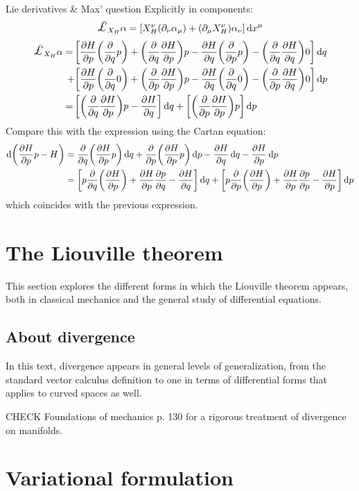 \begin{aside}{Lie derivatives \& Max' question}
    Explicitly in components:
    \begin{equation*}
        \lied{X_H}{\alpha} = \qty[X_H^{\nu}(\partial_{\nu}\alpha_{\mu}) + (\partial_{\mu} X_H^{\nu})\alpha_{\nu}]\dd{x}^{\mu}
    \end{equation*}
    \begin{equation*}
        \begin{split}
            \lied{X_H}{\alpha} =\, &\qty[\pdv{H}{p}\qty(\pdv{}{q}p) + \qty(\pdv{}{q}\pdv{H}{p})p - \pdv{H}{q}\qty(\pdv{}{p}p) - \qty(\pdv{}{q}\pdv{H}{q})0]\dd{q} \\
                                + &\qty[\pdv{H}{p}\qty(\pdv{}{q}0) + \qty(\pdv{}{p}\pdv{H}{p})p - \pdv{H}{q}\qty(\pdv{}{q} 0) - \qty(\pdv{}{p}\pdv{H}{q})0]\dd{p} \\
                               =\,&\qty[ \qty(\pdv{}{q}\pdv{H}{p})p - \pdv{H}{q}]\dd{q} + \qty[\qty(\pdv{}{p}\pdv{H}{p})p]\dd{p}\\
        \end{split}
    \end{equation*}
    Compare this with the expression using the Cartan equation:
    \begin{equation*}
        \begin{split}
            \dd{\qty(\pdv{H}{p}p - H)} &= \pdv{}{q}\qty(\pdv{H}{p}p)\dd{q} + \pdv{}{p}\qty(\pdv{H}{p}p)\dd{p} - \pdv{H}{q}\dd{q} - \pdv{H}{p}\dd{p}\\
                                       &= \qty[p\pdv{}{q}\qty(\pdv{H}{p}) + \pdv{H}{p}\pdv{p}{q} - \pdv{H}{q}]\dd{q} + \qty[p\pdv{}{p}\qty(\pdv{H}{p}) + \pdv{H}{p}\pdv{p}{p} - \pdv{H}{p}]\dd{p}
        \end{split}
    \end{equation*}
    which coincides with the previous expression.

\end{aside}

\section{The Liouville theorem}
This section explores the different forms in which the Liouville theorem appears, both in classical mechanics and the general study of differential equations.

\subsection{About divergence}
In this text, divergence appears in general levels of generalization, from the standard vector calculus definition to one in terms of differential forms that applies to curved spaces as well.

CHECK Foundations of mechanics p. 130 for a rigorous treatment of divergence on manifolds.

\section{Variational formulation}
